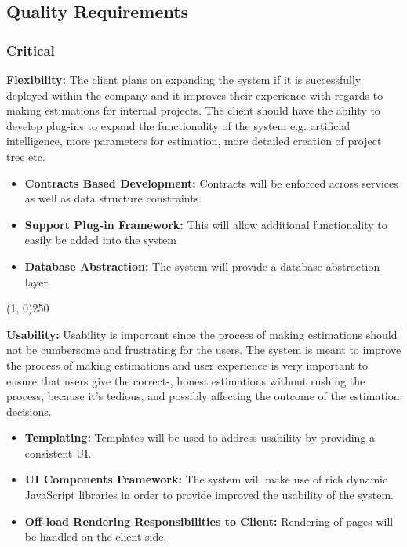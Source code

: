 \subsection{Quality Requirements}
\subsubsection{Critical}
	{\bfseries Flexibility:}
	The client plans on expanding the system if it is successfully deployed within the company and it improves their experience with regards to making estimations for internal projects. The client should have the ability to develop plug-ins to expand the functionality of the system e.g. artificial intelligence, more parameters for estimation, more detailed creation of project tree etc.
		\begin{itemize}
			\item{\bfseries Contracts Based Development:}
				Contracts will be enforced across services as well as data structure constraints.
			\item{\bfseries Support Plug-in Framework:}
				This will allow additional functionality to easily be added into the system
			\item{\bfseries Database Abstraction:}
				The system will provide a database abstraction layer.
		\end{itemize}
		\begin{center}
		\line(1, 0){250}
		\end{center}
	{\bfseries Usability:}
	Usability is important since the process of making estimations should not be cumbersome and frustrating for the users. The system is meant to improve the process of making estimations and user experience is very important to ensure that users give the correct-, honest estimations without rushing the process, because it's tedious, and possibly affecting the outcome of the estimation decisions.
		\begin{itemize}
			\item{\bfseries Templating:}
				Templates will be used to address usability by providing a consistent UI.
			\item{\bfseries UI Components Framework:}
				The system will make use of rich dynamic JavaScript libraries in order to provide improved the usability of the system.
			\item{\bfseries Off-load Rendering Responsibilities to Client:}
				Rendering of pages will be handled on the client side.
		\end{itemize}

